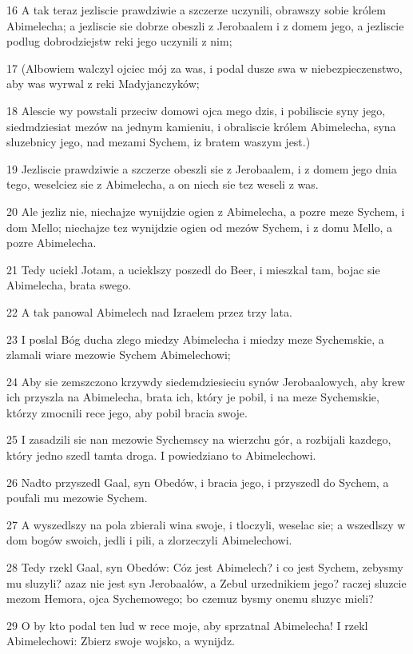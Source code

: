 \par 16 A tak teraz jezliscie prawdziwie a szczerze uczynili, obrawszy sobie królem Abimelecha; a jezliscie sie dobrze obeszli z Jerobaalem i z domem jego, a jezliscie podlug dobrodziejstw reki jego uczynili z nim;
\par 17 (Albowiem walczyl ojciec mój za was, i podal dusze swa w niebezpieczenstwo, aby was wyrwal z reki Madyjanczyków;
\par 18 Alescie wy powstali przeciw domowi ojca mego dzis, i pobiliscie syny jego, siedmdziesiat mezów na jednym kamieniu, i obraliscie królem Abimelecha, syna sluzebnicy jego, nad mezami Sychem, iz bratem waszym jest.)
\par 19 Jezliscie prawdziwie a szczerze obeszli sie z Jerobaalem, i z domem jego dnia tego, weselciez sie z Abimelecha, a on niech sie tez weseli z was.
\par 20 Ale jezliz nie, niechajze wynijdzie ogien z Abimelecha, a pozre meze Sychem, i dom Mello; niechajze tez wynijdzie ogien od mezów Sychem, i z domu Mello, a pozre Abimelecha.
\par 21 Tedy uciekl Jotam, a ucieklszy poszedl do Beer, i mieszkal tam, bojac sie Abimelecha, brata swego.
\par 22 A tak panowal Abimelech nad Izraelem przez trzy lata.
\par 23 I poslal Bóg ducha zlego miedzy Abimelecha i miedzy meze Sychemskie, a zlamali wiare mezowie Sychem Abimelechowi;
\par 24 Aby sie zemszczono krzywdy siedemdziesieciu synów Jerobaalowych, aby krew ich przyszla na Abimelecha, brata ich, który je pobil, i na meze Sychemskie, którzy zmocnili rece jego, aby pobil bracia swoje.
\par 25 I zasadzili sie nan mezowie Sychemscy na wierzchu gór, a rozbijali kazdego, który jedno szedl tamta droga. I powiedziano to Abimelechowi.
\par 26 Nadto przyszedl Gaal, syn Obedów, i bracia jego, i przyszedl do Sychem, a poufali mu mezowie Sychem.
\par 27 A wyszedlszy na pola zbierali wina swoje, i tloczyli, weselac sie; a wszedlszy w dom bogów swoich, jedli i pili, a zlorzeczyli Abimelechowi.
\par 28 Tedy rzekl Gaal, syn Obedów: Cóz jest Abimelech? i co jest Sychem, zebysmy mu sluzyli? azaz nie jest syn Jerobaalów, a Zebul urzednikiem jego? raczej sluzcie mezom Hemora, ojca Sychemowego; bo czemuz bysmy onemu sluzyc mieli?
\par 29 O by kto podal ten lud w rece moje, aby sprzatnal Abimelecha! I rzekl Abimelechowi: Zbierz swoje wojsko, a wynijdz.
